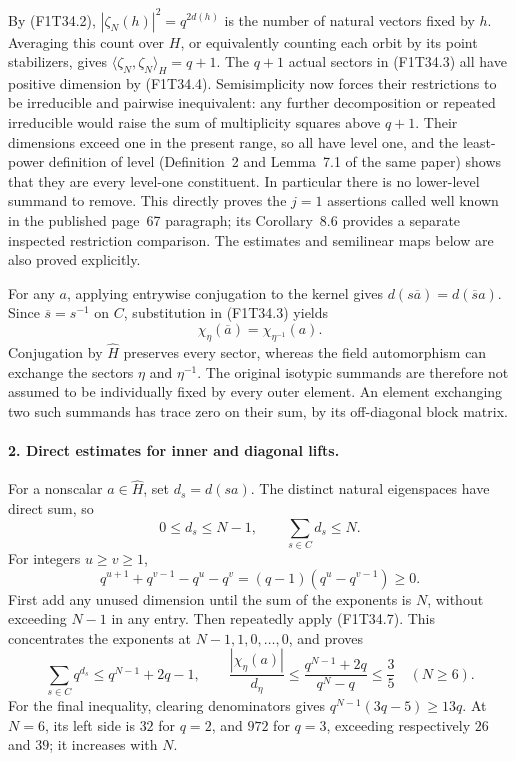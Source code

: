 By (F1T34.2), \(|\zeta_N(h)|^2=q^{2d(h)}\) is the
number of natural vectors fixed by \(h\). Averaging
this count over \(H\), or equivalently counting
each orbit by its point stabilizers, gives
\(\langle\zeta_N,\zeta_N\rangle_H=q+1\).
The \(q+1\) actual sectors in (F1T34.3) all have
positive dimension by (F1T34.4). Semisimplicity now
forces their restrictions to be irreducible and
pairwise inequivalent: any further decomposition
or repeated irreducible would raise the sum of
multiplicity squares above \(q+1\). Their dimensions
exceed one in the present range, so all have level
one, and the least-power definition of level
(Definition~2 and Lemma~7.1 of the same paper)
shows that they are every level-one constituent.
In particular there is no lower-level summand to
remove. This directly proves the \(j=1\) assertions
called well known in the published page~67
paragraph; its Corollary~8.6 provides a separate
inspected restriction comparison. The estimates
and semilinear maps below are also proved explicitly.

For any \(a\), applying entrywise conjugation to
the kernel gives
\(d(s\overline a)=d(\overline s a)\).
Since \(\overline s=s^{-1}\) on \(C\), substitution
in (F1T34.3) yields
\[
                  \chi_\eta(\overline a)
                         =\chi_{\eta^{-1}}(a).
 \tag{F1T34.5}
\]
Conjugation by \(\widehat H\) preserves every sector,
whereas the field automorphism can exchange the
sectors \(\eta\) and \(\eta^{-1}\). The original
isotypic summands are therefore not assumed to be
individually fixed by every outer element. An element
exchanging two such summands has trace zero on their
sum, by its off-diagonal block matrix.

\paragraph{2. Direct estimates for inner and diagonal lifts.}
For a nonscalar \(a\in\widehat H\), set
\(d_s=d(sa)\). The distinct natural eigenspaces
have direct sum, so
\[
 0\le d_s\le N-1,\qquad \sum_{s\in C}d_s\le N.
 \tag{F1T34.6}
\]
For integers \(u\ge v\ge1\),
\[
 q^{u+1}+q^{v-1}-q^u-q^v
                 =(q-1)(q^u-q^{v-1})\ge0.
 \tag{F1T34.7}
\]
First add any unused dimension until the sum of the
exponents is \(N\), without exceeding \(N-1\) in
any entry. Then repeatedly apply (F1T34.7). This
concentrates the exponents at \(N-1,1,0,\ldots,0\),
and proves
\[
 \sum_{s\in C}q^{d_s}\le q^{N-1}+2q-1,
 \qquad
 \frac{|\chi_\eta(a)|}{d_\eta}
     \le\frac{q^{N-1}+2q}{q^N-q}\le\frac35
                              \quad(N\ge6).
 \tag{F1T34.8}
\]
For the final inequality, clearing denominators gives
\(q^{N-1}(3q-5)\ge13q\). At \(N=6\), its left
side is \(32\) for \(q=2\), and \(972\) for
\(q=3\), exceeding respectively \(26\) and \(39\);
it increases with \(N\).

